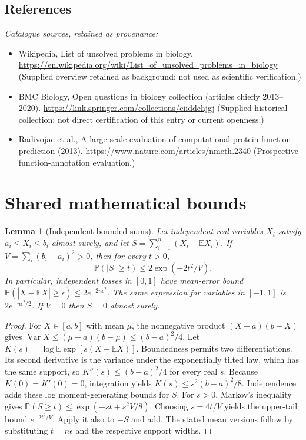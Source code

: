 \documentclass[11pt]{article}
\newcommand{\E}{\mathbb E}
\newcommand{\Prob}{\mathbb P}
\DeclareMathOperator{\Var}{Var}
\providecommand{\E}{\mathbb E}
\providecommand{\Prob}{\mathbb P}
\providecommand{\Var}{\operatorname{Var}}
\newtheorem{sharedlemma}{Lemma}[section]
\begin{document}
\subsection{References}
\noindent\emph{Catalogue sources, retained as provenance:}
\begin{itemize}
\item Wikipedia, List of unsolved problems in biology. \url{https://en.wikipedia.org/wiki/List_of_unsolved_problems_in_biology} (Supplied overview retained as background; not used as scientific verification.)
\item BMC Biology, Open questions in biology collection (articles chiefly 2013--2020). \url{https://link.springer.com/collections/eiiddehjgj} (Supplied historical collection; not direct certification of this entry or current openness.)
\item Radivojac et al., A large-scale evaluation of computational protein function prediction (2013). \url{https://www.nature.com/articles/nmeth.2340} (Prospective function-annotation evaluation.)
\end{itemize}
\clearpage


\appendix
\section{Shared mathematical bounds}\label{app:bounds}
\begin{sharedlemma}[Independent bounded sums]\label{lem:bounded}
Let independent real variables $X_i$ satisfy $a_i\leq X_i\leq b_i$ almost surely,
and let $S=\sum_{i=1}^n(X_i-\E X_i)$. If
$V=\sum_i(b_i-a_i)^2>0$, then for every $t>0$,
\[
 \Prob(|S|\geq t)\leq 2\exp(-2t^2/V).
\]
In particular, independent losses in $[0,1]$ have mean-error bound
$\Prob(|\overline X-\E\overline X|\geq\epsilon)
\leq2e^{-2n\epsilon^2}$. The same expression for variables in $[-1,1]$
is $2e^{-n\epsilon^2/2}$. If $V=0$ then $S=0$ almost surely.
\end{sharedlemma}
\begin{proof}
For $X\in[a,b]$ with mean $\mu$, the nonnegative product
$(X-a)(b-X)$ gives
$\Var X\leq(\mu-a)(b-\mu)\leq(b-a)^2/4$.
Let $K(s)=\log\E\exp[s(X-\E X)]$.
Boundedness permits two differentiations. Its second derivative is the variance
under the exponentially tilted law, which has the same support, so
$K''(s)\leq(b-a)^2/4$ for every real $s$.
Because $K(0)=K'(0)=0$, integration yields
$K(s)\leq s^2(b-a)^2/8$.
Independence adds these log moment-generating bounds for $S$.
For $s>0$, Markov's inequality gives
$\Prob(S\geq t)\leq\exp(-st+s^2V/8)$.
Choosing $s=4t/V$ yields the upper-tail bound $e^{-2t^2/V}$.
Apply it also to $-S$ and add. The stated mean versions follow by substituting
$t=n\epsilon$ and the respective support widths.
\end{proof}
\end{document}
